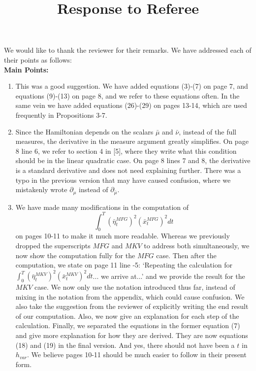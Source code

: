 \documentclass[]{article}
\title{Response to Referee}
\author{}
\begin{document}
\maketitle

We would like to thank the reviewer for their remarks. We have addressed each of their points as follows:\\

\hspace{-7mm} \textbf{Main Points:}
\begin{enumerate}
	\item This was a good suggestion. We have added equations (3)-(7) on page 7, and equations (9)-(13) on page 8, and we refer to these equations often. In the same vein we have added equations (26)-(29) on pages 13-14, which are used frequently in Propositions 3-7.
	\item Since the Hamiltonian depends on the scalars $\bar{\mu}$ and $\bar{\nu}$, instead of the full measures, the derivative in the measure argument greatly simplifies. On page 8 line 6, we refer to section 4 in [5], where they write what this condition should be in the linear quadratic case. On page 8 lines 7 and 8, the derivative is a standard derivative and does not need explaining further. There was a typo in the previous version that may have caused confusion, where we mistakenly wrote $\partial_{\mu}$ instead of $\partial_{\bar{\mu}}$.
	
	\item We have made many modifications in the computation of
	 $$\int_0^T (\bar{\eta}^{MFG}_t)^2 (\bar{x}^{MFG}_t)^2dt$$
	  on pages 10-11 to make it much more readable. Whereas we previously dropped the superscripts $MFG$ and $MKV$ to address both simultaneously, we now show the computation fully for the $MFG$ case. Then after the computation, we state on page 11 line -5: `Repeating the calculation for $\int_0^T (\bar{\eta}^{MKV}_t)^2 (\bar{x}^{MKV}_t)^2dt$... we arrive at...' and we provide the result for the $MKV$ case. We now only use the notation introduced thus far, instead of mixing in the notation from the appendix, which could cause confusion. We also take the suggestion from the reviewer of explicitly writing the end result of our computation. Also, we now give an explanation for each step of the calculation. Finally, we separated the equations in the former equation (7) and give more explanation for how they are derived. They are now equations (18) and (19) in the final version. And yes, there should not have been a $t$ in $h_{var}$. We believe pages 10-11 should be much easier to follow in their present form.
	  

\end{enumerate}
\end{document}
